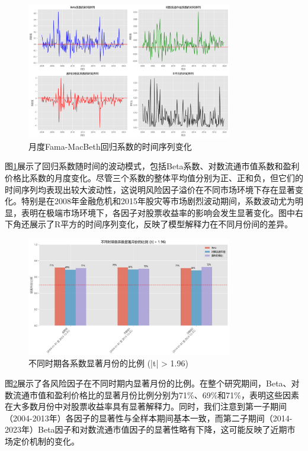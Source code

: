 \documentclass[12pt, a4paper]{article}
\begin{document}
\begin{figure}[htbp]
\centering
\includegraphics[width=0.8\textwidth]{./img/Beta系数的时间序列.png}
\caption{月度Fama-MacBeth回归系数的时间序列变化}
\label{fig:beta_timeseries}
\end{figure}

图\ref{fig:beta_timeseries}展示了回归系数随时间的波动模式，包括Beta系数、对数流通市值系数和盈利价格比系数的月度变化。尽管三个系数的整体平均值分别为正、正和负，但它们的时间序列均表现出较大波动性，这说明风险因子溢价在不同市场环境下存在显著变化。特别是在2008年金融危机和2015年股灾等市场剧烈波动期间，系数波动尤为明显，表明在极端市场环境下，各因子对股票收益率的影响会发生显著变化。图中右下角还展示了R平方的时间序列变化，反映了模型解释力在不同月份间的差异。

\begin{figure}[htbp]
\centering
\includegraphics[width=0.8\textwidth]{./img/不同时期各系数显著月份的比例.png}
\caption{不同时期各系数显著月份的比例 (|t| > 1.96)}
\label{fig:coef_significance}
\end{figure}

图\ref{fig:coef_significance}展示了各风险因子在不同时期内显著月份的比例。在整个研究期间，Beta、对数流通市值和盈利价格比的显著月份比例分别为71\%、69\%和71\%，表明这些因素在大多数月份中对股票收益率具有显著解释力。同时，我们注意到第一子期间（2004-2013年）各因子的显著性与全样本期间基本一致，而第二子期间（2014-2023年）Beta因子和对数流通市值因子的显著性略有下降，这可能反映了近期市场定价机制的变化。
\end{document}

